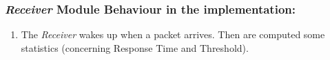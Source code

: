 \subsubsection{\textit{Receiver} Module Behaviour in the implementation:}
\begin{enumerate}
	\item The \textit{Receiver} wakes up when a packet arrives. Then are computed some statistics (concerning Response Time and Threshold).
\end{enumerate}